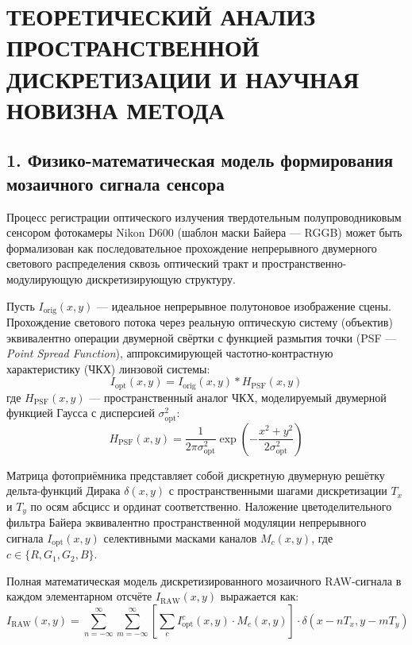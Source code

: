 \documentclass[12pt,a4paper]{article}
\begin{document}
\section*{ТЕОРЕТИЧЕСКИЙ АНАЛИЗ ПРОСТРАНСТВЕННОЙ ДИСКРЕТИЗАЦИИ И НАУЧНАЯ НОВИЗНА МЕТОДА}

\subsection*{1. Физико-математическая модель формирования мозаичного сигнала сенсора}

Процесс регистрации оптического излучения твердотельным полупроводниковым сенсором фотокамеры Nikon D600 (шаблон маски Байера --- RGGB) может быть формализован как последовательное прохождение непрерывного двумерного светового распределения сквозь оптический тракт и пространственно-модулирующую дискретизирующую структуру.

Пусть $I_{\text{orig}}(x, y)$ --- идеальное непрерывное полутоновое изображение сцены. Прохождение светового потока через реальную оптическую систему (объектив) эквивалентно операции двумерной свёртки с функцией размытия точки (PSF --- \textit{Point Spread Function}), аппроксимирующей частотно-контрастную характеристику (ЧКХ) линзовой системы:
\begin{equation}
I_{\text{opt}}(x, y) = I_{\text{orig}}(x, y) * H_{\text{PSF}}(x, y)
\end{equation}
где $H_{\text{PSF}}(x, y)$ --- пространственный аналог ЧКХ, моделируемый двумерной функцией Гаусса с дисперсией $\sigma_{\text{opt}}^2$:
\begin{equation}
H_{\text{PSF}}(x, y) = \frac{1}{2\pi\sigma_{\text{opt}}^2} \exp\left( -\frac{x^2 + y^2}{2\sigma_{\text{opt}}^2} \right)
\end{equation}

Матрица фотоприёмника представляет собой дискретную двумерную решётку дельта-функций Дирака $\delta(x,y)$ с пространственными шагами дискретизации $T_x$ и $T_y$ по осям абсцисс и ординат соответственно. Наложение цветоделительного фильтра Байера эквивалентно пространственной модуляции непрерывного сигнала $I_{\text{opt}}(x, y)$ селективными масками каналов $M_c(x, y)$, где $c \in \{R, G_1, G_2, B\}$.

Полная математическая модель дискретизированного мозаичного RAW-сигнала в каждом элементарном отсчёте $I_{\text{RAW}}(x, y)$ выражается как:
\begin{equation}
I_{\text{RAW}}(x, y) = \sum_{n=-\infty}^{\infty} \sum_{m=-\infty}^{\infty} \left[ \sum_{c} I_{\text{opt}}^c(x, y) \cdot M_c(x, y) \right] \cdot \delta(x - nT_x, y - mT_y)
\end{equation}
\end{document}
